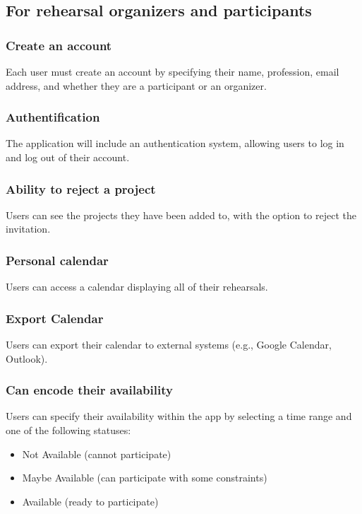 \documentclass[11pt]{article}
\begin{document}
\subsection{For rehearsal organizers and participants}

\subsubsection{Create an account}
Each user must create an account by specifying their name, profession, email address, and whether they are a participant or an organizer.

\subsubsection{Authentification}
The application will include an authentication system, allowing users to log in and log out of their account.

\subsubsection{Ability to reject a project}
Users can see the projects they have been added to, with the option to reject the invitation.

\subsubsection{Personal calendar}
Users can access a calendar displaying all of their rehearsals.

\subsubsection{Export Calendar}
Users can export their calendar to external systems (e.g., Google Calendar, Outlook).

\subsubsection{Can encode their availability}
Users can specify their availability within the app by selecting a time range and one of the following statuses: 
\begin{itemize} 
    \item Not Available (cannot participate) 
    \item Maybe Available (can participate with some constraints) 
    \item Available (ready to participate) 
\end{itemize}
\end{document}
